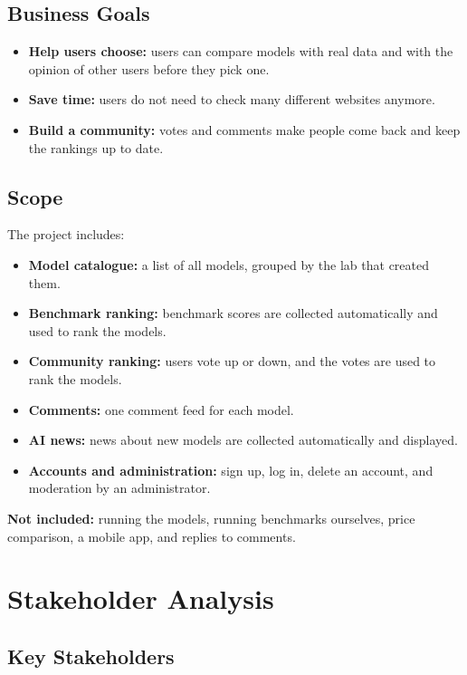 \documentclass[11pt,a4paper]{article}
\begin{document}
\subsection{Business Goals}

\begin{itemize}
  \item \textbf{Help users choose:} users can compare models with real data and with the opinion of other users before they pick one.
  \item \textbf{Save time:} users do not need to check many different websites anymore.
  \item \textbf{Build a community:} votes and comments make people come back and keep the rankings up to date.
\end{itemize}

\subsection{Scope}

The project includes:
\begin{itemize}
  \item \textbf{Model catalogue:} a list of all models, grouped by the lab that created them.
  \item \textbf{Benchmark ranking:} benchmark scores are collected automatically and used to rank the models.
  \item \textbf{Community ranking:} users vote up or down, and the votes are used to rank the models.
  \item \textbf{Comments:} one comment feed for each model.
  \item \textbf{AI news:} news about new models are collected automatically and displayed.
  \item \textbf{Accounts and administration:} sign up, log in, delete an account, and moderation by an administrator.
\end{itemize}

\noindent\textbf{Not included:} running the models, running benchmarks ourselves, price comparison, a mobile app, and replies to comments.

\section{Stakeholder Analysis}

\subsection{Key Stakeholders}
\end{document}
